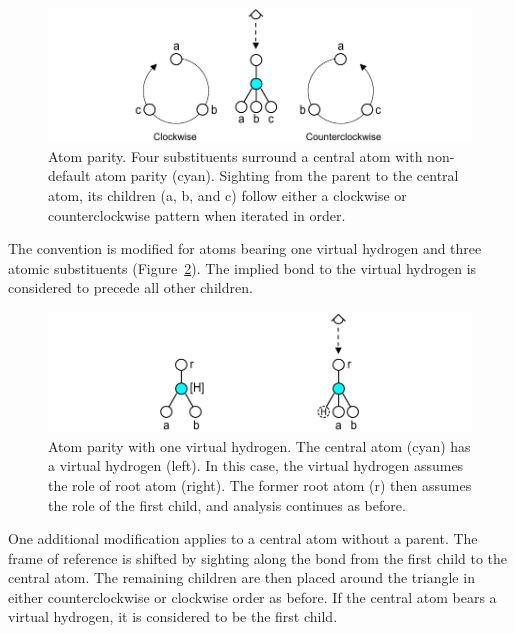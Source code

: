 \documentclass{article}
\begin{document}
\begin{figure}
    \centering
    \includegraphics[width=\columnwidth]{atom-parity.pdf}
    \caption{Atom parity. Four substituents surround a central atom with non-default atom parity (cyan). Sighting from the parent to the central atom, its children (a, b, and c) follow either a clockwise or counterclockwise pattern when iterated in order.}
    \label{fig:atom-parity}
\end{figure}

The convention is modified for atoms bearing one virtual hydrogen and three atomic substituents (Figure~\ref{fig:atom-parity-suppressed-hydrogen}). The implied bond to the virtual hydrogen is considered to precede all other children.

\begin{figure}
    \centering
    \includegraphics[width=\columnwidth]{atom-parity-suppressed-hydrogen.pdf}
    \caption{Atom parity with one virtual hydrogen. The central atom (cyan) has a virtual hydrogen (left). In this case, the virtual hydrogen assumes the role of root atom (right). The former root atom (r) then assumes the role of the first child,  and analysis continues as before.}
    \label{fig:atom-parity-suppressed-hydrogen}
\end{figure}

One additional modification applies to a central atom without a parent. The frame of reference is shifted by sighting along the bond from the first child to the central atom. The remaining children are then placed around the triangle in either counterclockwise or clockwise order as before. If the central atom bears a virtual hydrogen, it is considered to be the first child.
\end{document}
